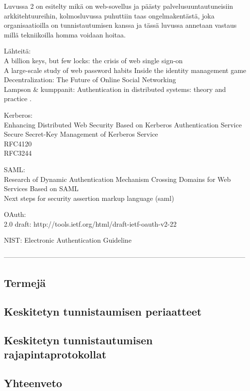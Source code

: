 Luvussa 2 on esitelty mikä on web-sovellus ja päästy palvelusuuntautuneisiin arkkitehtuureihin, kolmosluvussa puhuttiin taas ongelmakentästä, joka organisaatioilla on tunnistautumisen kanssa ja tässä luvussa annetaan vastaus millä tekniikoilla homma voidaan hoitaa.

Lähteitä:\\
A billion keys, but few locks: the crisis of web single sign-on \cite{billion_keys}\\
A large-scale study of web password habits \cite{password_habits}
Inside the identity management game \cite{inside_the_identity_management_game}\\
Decentralization: The Future of Online Social Networking \cite{decentralisations}\\
Lampson \& kumppanit: Authentication in distributed systems: theory and practice \cite{lampson}.

Kerberos:\\
Enhancing Distributed Web Security Based on Kerberos Authentication Service \cite{enchancing_distributed_web_security}\\
Secure Secret-Key Management of Kerberos Service \cite{secure_secret_key}\\
RFC4120 \cite{rfc4120}\\
RFC3244 \cite{rfc3244}

SAML:\\
Research of Dynamic Authentication Mechanism Crossing Domains for Web Services Based on SAML \cite{dynamic_saml}\\
Next steps for security assertion markup language (saml) \cite{next_saml}

OAuth:\\
2.0 draft: http://tools.ietf.org/html/draft-ietf-oauth-v2-22 \cite{oauth2_0}

NIST: Electronic Authentication Guideline \cite{nisti}

-----------------------------------------------------------------------------------------------------------


\subsection{Termejä}

\subsection{Keskitetyn tunnistaumisen periaatteet}

\subsection{Keskitetyn tunnistautumisen rajapintaprotokollat}

\subsection{Yhteenveto}

